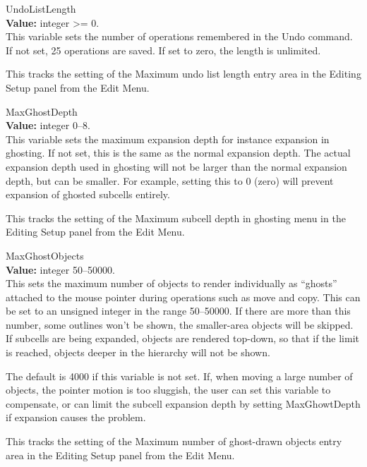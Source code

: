 \begin{description}
\item{\et UndoListLength}\\
{\bf Value:} integer {\vt >=} 0.\\
This variable sets the number of operations remembered in the {\cb
Undo} command.  If not set, 25 operations are saved.  If set to zero,
the length is unlimited.

This tracks the setting of the {\cb Maximum undo list length} entry
area in the {\cb Editing Setup} panel from the {\cb Edit Menu}.

\item{\et MaxGhostDepth}\\
{\bf Value:} integer 0--8.\\
This variable sets the maximum expansion depth for instance expansion
in ghosting.  If not set, this is the same as the normal expansion
depth.  The actual expansion depth used in ghosting will not be larger
than the normal expansion depth, but can be smaller.  For example,
setting this to 0 (zero) will prevent expansion of ghosted subcells
entirely.

This tracks the setting of the {\cb Maximum subcell depth in ghosting}
menu in the {\cb Editing Setup} panel from the {\cb Edit Menu}.

\item{\et MaxGhostObjects}\\
{\bf Value:} integer 50--50000.\\
This sets the maximum number of objects to render individually as
``ghosts'' attached to the mouse pointer during operations such as
move and copy.  This can be set to an unsigned integer in the range
50--50000.  If there are more than this number, some outlines won't be
shown, the smaller-area objects will be skipped.  If subcells are
being expanded, objects are rendered top-down, so that if the limit is
reached, objects deeper in the hierarchy will not be shown.

The default is 4000 if this variable is not set.  If, when moving a
large number of objects, the pointer motion is too sluggish, the user
can set this variable to compensate, or can limit the subcell
expansion depth by setting {\et MaxGhowtDepth} if expansion causes the
problem.

This tracks the setting of the {\cb Maximum number of ghost-drawn
objects} entry area in the {\cb Editing Setup} panel from the {\cb
Edit Menu}.


\end{description}
